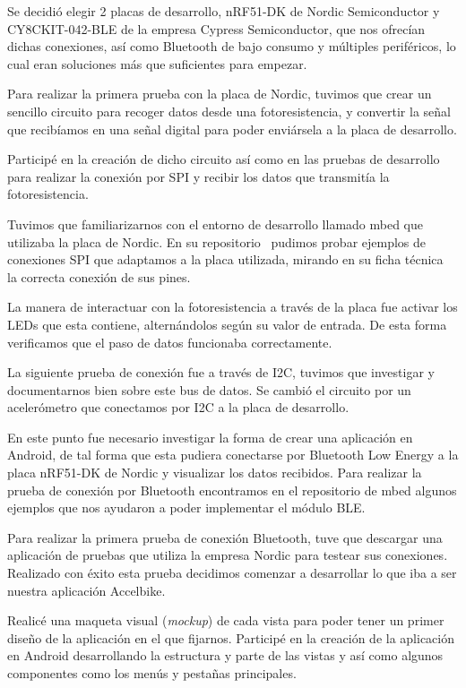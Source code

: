 Se decidió elegir 2 placas de desarrollo, nRF51-DK de Nordic Semiconductor y CY8CKIT-042-BLE de la empresa Cypress Semiconductor, que nos ofrecían dichas conexiones, así como Bluetooth de bajo consumo y múltiples periféricos, lo cual eran soluciones más que suficientes para empezar.

Para realizar la primera prueba con la placa de Nordic, tuvimos que crear un sencillo circuito para recoger datos desde una fotoresistencia, y convertir la señal que recibíamos en una señal digital para poder enviársela a la placa de desarrollo.

Participé en la creación de dicho circuito así como en las pruebas de desarrollo para realizar la conexión por SPI y recibir los datos que transmitía la fotoresistencia.

Tuvimos que familiarizarnos con el entorno de desarrollo llamado mbed que utilizaba la placa de Nordic. En su repositorio~\cite{repoMbed} pudimos probar ejemplos de conexiones SPI que adaptamos a la placa utilizada, mirando en su ficha técnica~\cite{NordicDatasheet} la correcta conexión de sus pines.

La manera de interactuar con la fotoresistencia a través de la placa fue activar los LEDs que esta contiene, alternándolos según su valor de entrada. De esta forma verificamos que el paso de datos funcionaba correctamente.

La siguiente prueba de conexión fue a través de I2C, tuvimos que investigar y documentarnos bien sobre este bus de datos. Se cambió el circuito por un acelerómetro que conectamos por I2C a la placa de desarrollo.

En este punto fue necesario investigar la forma de crear una aplicación en Android, de tal forma que esta pudiera conectarse por Bluetooth Low Energy a la placa nRF51-DK de Nordic y visualizar los datos recibidos. Para realizar la prueba de conexión por Bluetooth encontramos en el repositorio de mbed algunos ejemplos que nos ayudaron a poder implementar el módulo BLE.

Para realizar la primera prueba de conexión Bluetooth, tuve que descargar una aplicación de pruebas que utiliza la empresa Nordic para testear sus conexiones. Realizado con éxito esta prueba decidimos comenzar a desarrollar lo que iba a ser nuestra aplicación Accelbike.

Realicé una maqueta visual (\textit{mockup}) de cada vista para poder tener un primer diseño de la aplicación en el que fijarnos.
Participé en la creación de la aplicación en Android desarrollando la estructura y parte de las vistas y así como algunos componentes como los menús y pestañas principales.

